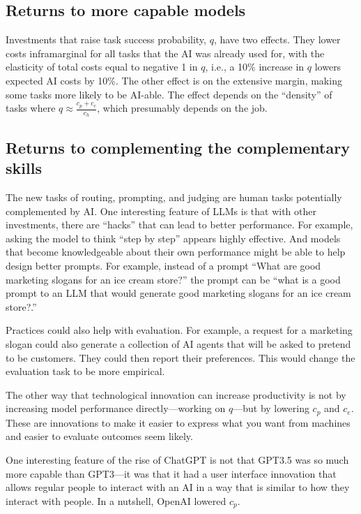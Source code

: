 \documentclass{article}
\begin{document}
\subsection{Returns to more capable models}
Investments that raise task success probability, $q$, have two effects. 
They lower costs inframarginal for all tasks that the AI was already used for, with the elasticity of total costs equal to negative 1 in $q$, i.e., a 10\% increase in $q$ lowers expected AI costs by 10\%. 
The other effect is on the extensive margin, making some tasks more likely to be AI-able. 
The effect depends on the ``density'' of tasks where $q \approx \frac{c_p + c_e}{c_h}$, which presumably depends on the job.

\subsection{Returns to complementing the complementary skills}
The new tasks of routing, prompting, and judging are human tasks potentially complemented by AI. 
One interesting feature of LLMs is that with other investments, there are ``hacks'' that can lead to better performance. For example, asking the model to think ``step by step'' appears highly effective. 
And models that become knowledgeable about their own performance might be able to help design better prompts. 
For example, instead of a prompt ``What are good marketing slogans for an ice cream store?'' the prompt can be  ``what is a good prompt to an LLM that would generate good marketing slogans for an ice cream store?.''

Practices could also help with evaluation. 
For example, a request for a marketing slogan could also generate a collection of AI agents that will be asked to pretend to be customers.
They could then report their preferences. 
This would change the evaluation task to be more empirical. 

The other way that technological innovation can increase productivity is not by increasing model performance directly---working on $q$---but by lowering $c_p$ and $c_e$. 
These are innovations to make it easier to express what you want from machines and easier to evaluate outcomes seem likely. 

One interesting feature of the rise of ChatGPT is not that GPT3.5 was so much more capable than GPT3---it was that it had a user interface innovation that allows regular people to interact with an AI in a way that is similar to how they interact with people.
In a nutshell, OpenAI lowered $c_p$.
\end{document}
